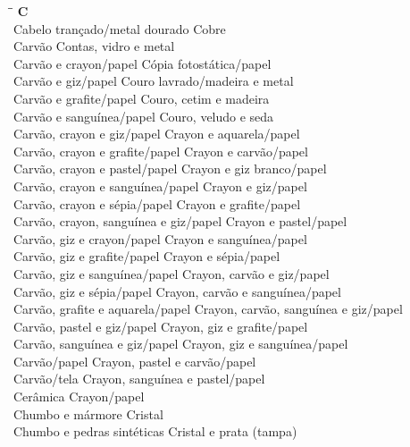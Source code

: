 \begin{tabbing}
	\hspace{8,7cm}\=\hspace{1cm}\=\kill
	\textbf{C} \>  \\ 
	Cabelo trançado/metal dourado	\> Cobre\\
	Carvão \> Contas, vidro e metal\\
	Carvão e crayon/papel \> Cópia fotostática/papel\\
	Carvão e giz/papel \> Couro lavrado/madeira e metal\\ 
	Carvão e grafite/papel \>  Couro, cetim e madeira\\ 
	Carvão e sanguínea/papel \> Couro, veludo e seda\\ 
	Carvão, crayon e giz/papel \> Crayon e aquarela/papel\\
	Carvão, crayon e grafite/papel \> Crayon e carvão/papel \\
	Carvão, crayon e pastel/papel \> Crayon e giz branco/papel \\ 
	Carvão, crayon e sanguínea/papel \> Crayon e giz/papel \\ 
	Carvão, crayon e sépia/papel \> Crayon e grafite/papel\\
	Carvão, crayon, sanguínea e giz/papel  \> Crayon e pastel/papel\\
	Carvão, giz e crayon/papel  \> Crayon e sanguínea/papel\\
	Carvão, giz e grafite/papel  \> Crayon e sépia/papel\\
	Carvão, giz e sanguínea/papel \> Crayon, carvão e giz/papel\\
	Carvão, giz e sépia/papel \> Crayon, carvão e sanguínea/papel\\
	Carvão, grafite e aquarela/papel \> Crayon, carvão, sanguínea e giz/papel\\
	Carvão, pastel e giz/papel \> Crayon, giz e grafite/papel\\ 
	Carvão, sanguínea e giz/papel \>  Crayon, giz e sanguínea/papel\\ 
	Carvão/papel \> Crayon, pastel e carvão/papel\\ 
	Carvão/tela \> Crayon, sanguínea e pastel/papel\\
	Cerâmica \> Crayon/papel \\
	Chumbo e mármore \> Cristal \\ 
	Chumbo e pedras sintéticas	\> Cristal e prata (tampa) \\	   
\end{tabbing}

